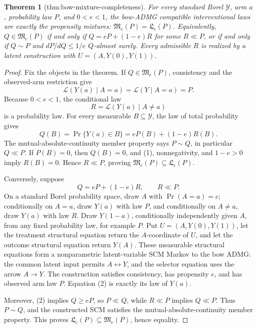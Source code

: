 \documentclass{article}
\newtheorem{theorem}{Theorem}
\begin{document}
\begin{theorem}[thm:bow-mixture-completeness]\label{thm:bow-mixture-completeness}
For every standard Borel \(\mathcal Y\), arm \(a\), probability law \(P\), and \(0<e<1\), the bow-ADMG compatible interventional laws are exactly the propensity mixtures: \(\mathfrak M_e(P)=\mathfrak L_e(P)\). Equivalently, \(Q\in\mathfrak M_e(P)\) if and only if \(Q=eP+(1-e)R\) for some \(R\ll P\), or if and only if \(Q\sim P\) and \(dP/dQ\le1/e\) \(Q\)-almost surely. Every admissible \(R\) is realized by a latent construction with \(U=(A,Y(0),Y(1))\).
\end{theorem}
\begin{proof}
Fix the objects in the theorem.  If \(Q\in\mathfrak M_e(P)\), consistency and the observed-arm restriction give
\[
 \mathcal L(Y(a)\mid A=a)=\mathcal L(Y\mid A=a)=P.
\]
Because \(0<e<1\), the conditional law
\[
 R=\mathcal L(Y(a)\mid A\ne a)
\]
is a probability law.  For every measurable \(B\subseteq\mathcal Y\), the law of total probability gives
\[
 Q(B)=\Pr\{Y(a)\in B\}=eP(B)+(1-e)R(B). \tag{1}
\]
The mutual-absolute-continuity member property says \(P\sim Q\), in particular \(Q\ll P\).  If \(P(B)=0\), then \(Q(B)=0\), and (1), nonnegativity, and \(1-e>0\) imply \(R(B)=0\).  Hence \(R\ll P\), proving \(\mathfrak M_e(P)\subseteq\mathfrak L_e(P)\).

Conversely, suppose
\[
 Q=eP+(1-e)R,\qquad R\ll P. \tag{2}
\]
On a standard Borel probability space, draw \(A\) with \(\Pr(A=a)=e\); conditionally on \(A=a\), draw \(Y(a)\) with law \(P\), and conditionally on \(A\ne a\), draw \(Y(a)\) with law \(R\).  Draw \(Y(1-a)\), conditionally independently given \(A\), from any fixed probability law, for example \(P\).  Put \(U=(A,Y(0),Y(1))\), let the treatment structural equation return the \(A\)-coordinate of \(U\), and let the outcome structural equation return \(Y(A)\).  These measurable structural equations form a nonparametric latent-variable SCM Markov to the bow ADMG: the common latent input permits \(A\leftrightarrow Y\), and the selector equation uses the arrow \(A\to Y\).  The construction satisfies consistency, has propensity \(e\), and has observed arm law \(P\).  Equation (2) is exactly its law of \(Y(a)\).

Moreover, (2) implies \(Q\ge eP\), so \(P\ll Q\), while \(R\ll P\) implies \(Q\ll P\).  Thus \(P\sim Q\), and the constructed SCM satisfies the mutual-absolute-continuity member property.  This proves \(\mathfrak L_e(P)\subseteq\mathfrak M_e(P)\), hence equality.


\end{proof}
\end{document}
